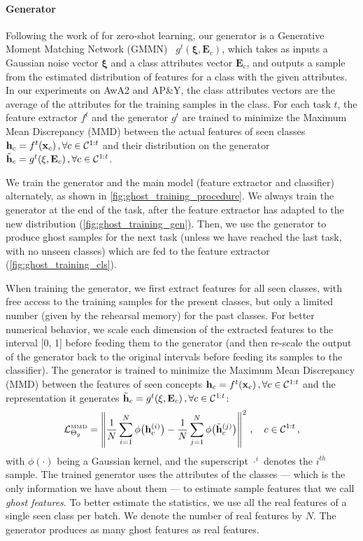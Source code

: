 \paragraph{Generator} Following the work of \citet{bucher2017zeroshot_gmmn} for zero-shot learning,
our generator is a Generative Moment Matching Network (GMMN)~\citep{li2015gmmn} $g^t(\mathbf{\xi},
    \mathbf{E}_c)$, which takes as inputs a Gaussian noise vector $\mathbf{\xi}$ and a class attributes
vector $\mathbf{E}_c$, and outputs a sample from the estimated distribution of features for a class
with the given attributes. In our experiments on AwA2 and AP\&Y, the class attributes vectors are
the average of the attributes for the training samples in the class. For each task $t$, the feature
extractor $f^t$ and the generator $g^t$ are trained to minimize the Maximum Mean Discrepancy (MMD)
\citep{gretton2007twosampleMMD,gretton2012twosampletestMMD} between the actual features of seen
classes $\mathbf{h}_c = f^t(\mathbf{x}_c) \, , \forall c \in \mathcal{C}^{1:t}$ and their distribution on the generator
$\tilde{\mathbf{h}}_c = g^t(\mathbf{\xi}, \mathbf{E}_{c}) \,, \forall c \in \mathcal{C}^{1:t}$.

We train the generator and the main model (feature extractor and classifier) alternately, as shown
in \autoref{fig:ghost_training_procedure}. We always train the generator at the end of the task,
after the feature extractor has adapted to the new distribution (\autoref{fig:ghost_training_gen}).
Then, we use the generator to produce ghost samples for the next task (unless we have reached the
last task, with no unseen classes) which are fed to the feature extractor
(\autoref{fig:ghost_training_cls}).

When training the generator, we first extract features for all seen classes, with free access to the
training samples for the present classes, but only a limited number (given by the rehearsal memory)
for the past classes. For better numerical behavior, we scale each dimension of the extracted
features to the interval [0, 1] before feeding them to the generator (and then re-scale the output
of the generator back to the original intervals before feeding its samples to the classifier). The
generator is trained to minimize the Maximum Mean Discrepancy (MMD) between the features of seen
concepts $\mathbf{h}_c = f^t(\mathbf{x}_c) \, , \forall c \in \mathcal{C}^{1:t}$ and the representation it generates
$\tilde{\mathbf{h}}_c = g^t(\mathbf{\xi}, \mathbf{E}_{c}) \,, \forall c \in \mathcal{C}^{1:t}$:
%
\begin{equation}
    \mathcal{L}^\text{\tiny{MMD}}_{\Theta_g} = \left\Vert \frac{1}{N} \sum_{i=1}^N \phi\big(\mathbf{h}^{(i)}_c\big) - \frac{1}{N} \sum_{j=1}^N \phi\big(\tilde{\mathbf{h}}^{(j)}_c\big) \right\Vert^2\,, \quad c \in \mathcal{C}^{1:t}\,,
    \label{eq:mmd_loss}
\end{equation}
%
\noindent with $\phi(\cdot)$ being a Gaussian kernel, and the superscript $\cdot^i$ denotes the
$i^{th}$ sample. The trained generator uses the attributes of the classes — which is the only
information we have about them — to estimate sample features that we call \textit{ghost features}.
To better estimate the statistics, we use all the real features of a single seen class per batch. We
denote the number of real features by $N$. The generator produces as many ghost features as real
features.

